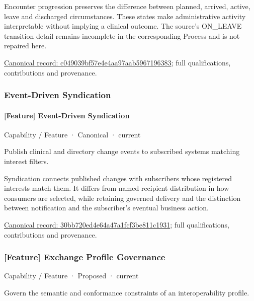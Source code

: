 Encounter progression preserves the difference between planned, arrived, active, leave and discharged circumstances. These states make administrative activity interpretable without implying a clinical outcome. The source's ON\_LEAVE transition detail remains incomplete in the corresponding Process and is not repaired here.


{\footnotesize \href{../../../../continuum/strategy/capability/feature/c049039bf57e4e4aa97aab5967196383.md}{Canonical record: c049039bf57e4e4aa97aab5967196383}; full qualifications, contributions and provenance.}\par
\subsubsection{Event-Driven Syndication}

\paragraph{[Feature] Event-Driven Syndication}

\label{element:30bb720ed4e64a47a1fcf3be811c1931}
{\small Capability / Feature · Canonical · current}\par

Publish clinical and directory change events to subscribed systems matching interest filters.



Syndication connects published changes with subscribers whose registered interests match them. It differs from named-recipient distribution in how consumers are selected, while retaining governed delivery and the distinction between notification and the subscriber's eventual business action.


{\footnotesize \href{../../../../continuum/strategy/capability/feature/30bb720ed4e64a47a1fcf3be811c1931.md}{Canonical record: 30bb720ed4e64a47a1fcf3be811c1931}; full qualifications, contributions and provenance.}\par
\subsubsection{[Feature] Exchange Profile Governance}

\label{element:5e59d8f2e23e4fb5b59a5bd1dd3f31fa}
{\small Capability / Feature · Proposed · current}\par

Govern the semantic and conformance constraints of an interoperability profile.



